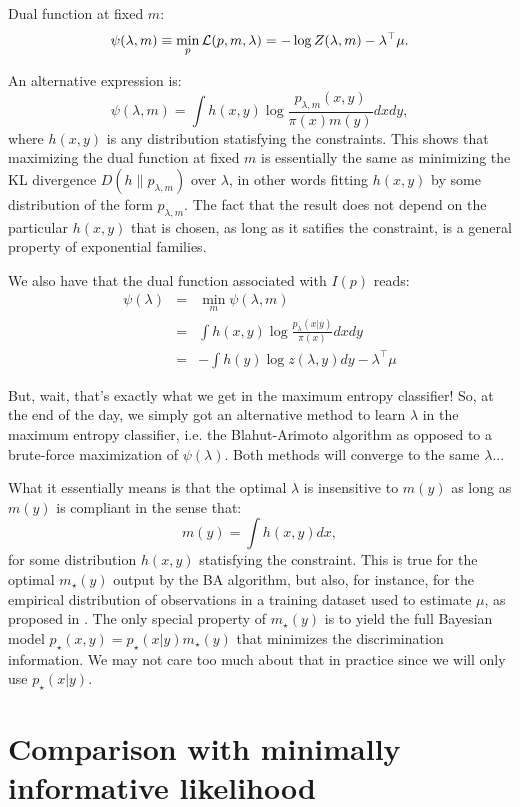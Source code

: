 \documentclass[english]{scrartcl}
\begin{document}
Dual function at fixed $m$:
$$
\psi(\lambda,m) 
\equiv \min_p {\cal L}(p,m,\lambda)
= 
- \log Z(\lambda,m) - \lambda^\top \mu
.
$$ 

An alternative expression is:
$$
\psi(\lambda, m)
= 
\int h(x,y) 
\log \frac{p_{\lambda,m}(x,y)}{\pi(x)m(y)} dxdy,
$$ where $h(x,y)$ is any distribution statisfying the
constraints. This shows that maximizing the dual function at fixed $m$
is essentially the same as minimizing the KL divergence
$D(h\|p_{\lambda,m})$ over $\lambda$, in other words fitting $h(x,y)$
by some distribution of the form $p_{\lambda,m}$. The fact that the
result does not depend on the particular $h(x,y)$ that is chosen, as
long as it satifies the constraint, is a general property of
exponential families.

We also have that the dual function associated with $I(p)$ reads:
\begin{eqnarray*}
\psi(\lambda) 
 & = & \min_m \psi(\lambda, m)\\
 & = & \int h(x,y) \log \frac{p_{\lambda}(x|y)}{\pi(x)} dxdy\\
 & = & -\int h(y) \log z(\lambda,y) dy - \lambda^\top \mu
\end{eqnarray*}

But, wait, that's exactly what we get in the maximum entropy
classifier! So, at the end of the day, we simply got an alternative
method to learn $\lambda$ in the maximum entropy classifier, i.e. the
Blahut-Arimoto algorithm as opposed to a brute-force maximization of
$\psi(\lambda)$. Both methods will converge to the same $\lambda$...

What it essentially means is that the optimal $\lambda$ is insensitive
to $m(y)$ as long as $m(y)$ is compliant in the sense that:
$$
m(y) = \int h(x,y) dx,
$$ for some distribution $h(x,y)$ statisfying the constraint. This is
true for the optimal $m_\star(y)$ output by the BA algorithm, but
also, for instance, for the empirical distribution of observations in
a training dataset used to estimate $\mu$, as proposed in
\cite{BergerA-96}. The only special property of $m_\star(y)$ is to
yield the full Bayesian model $p_\star(x,y)=p_\star(x|y)m_\star(y)$
that minimizes the discrimination information. We may not care too
much about that in practice since we will only use $p_\star(x|y)$. 

\section{Comparison with minimally informative likelihood}
\end{document}

